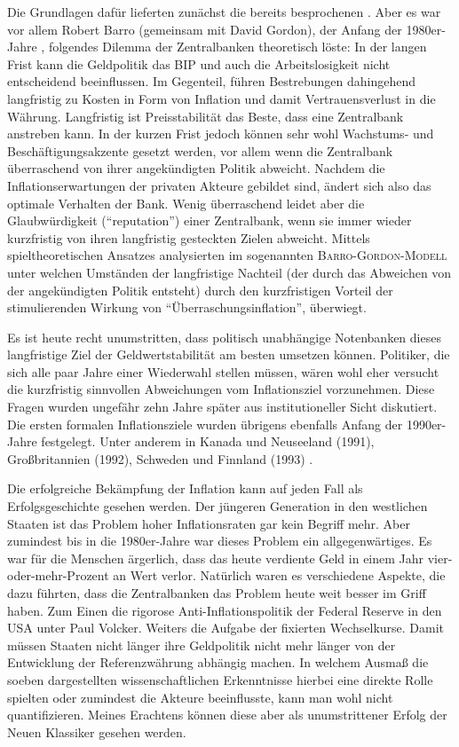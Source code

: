 Die Grundlagen dafür lieferten zunächst die bereits besprochenen \textcite{Kydland1977}. Aber es war vor allem Robert Barro (gemeinsam mit David Gordon), der Anfang der 1980er-Jahre \parencite{Barro1976, Barro1983a, Barro1983b}, folgendes Dilemma der Zentralbanken theoretisch löste: In der langen Frist kann die Geldpolitik das BIP und auch die Arbeitslosigkeit nicht entscheidend beeinflussen. Im Gegenteil, führen Bestrebungen dahingehend langfristig zu Kosten in Form von Inflation und damit Vertrauensverlust in die Währung. Langfristig ist Preisstabilität das Beste, dass eine Zentralbank anstreben kann. In der kurzen Frist jedoch können sehr wohl Wachstums- und Beschäftigungsakzente gesetzt werden, vor allem wenn die Zentralbank überraschend von ihrer angekündigten Politik abweicht. Nachdem die Inflationserwartungen der privaten Akteure gebildet sind, ändert sich also das optimale Verhalten der Bank. Wenig überraschend leidet aber die Glaubwürdigkeit ("`reputation"') einer Zentralbank, wenn sie immer wieder kurzfristig von ihren langfristig gesteckten Zielen abweicht. Mittels spieltheoretischen Ansatzes analysierten \textcite{Barro1983a} im sogenannten \textsc{Barro-Gordon-Modell} unter welchen Umständen der langfristige Nachteil (der durch das Abweichen von der angekündigten Politik entsteht) durch den kurzfristigen Vorteil der stimulierenden Wirkung von "`Überraschungsinflation"', überwiegt.

Es ist heute recht unumstritten, dass politisch unabhängige Notenbanken dieses langfristige Ziel der Geldwertstabilität am besten umsetzen können. Politiker, die sich alle paar Jahre einer Wiederwahl stellen müssen, wären wohl eher versucht die kurzfristig sinnvollen Abweichungen vom Inflationsziel vorzunehmen. Diese Fragen wurden ungefähr zehn Jahre später aus institutioneller Sicht \parencite{Tabellini1993} diskutiert. Die ersten formalen Inflationsziele wurden übrigens ebenfalls Anfang der 1990er-Jahre festgelegt. Unter anderem in Kanada und Neuseeland (1991), Großbritannien (1992), Schweden und Finnland (1993) \parencite{Fischer1994}. 

Die erfolgreiche Bekämpfung der Inflation kann auf jeden Fall als Erfolgsgeschichte gesehen werden. Der jüngeren Generation in den westlichen Staaten ist das Problem hoher Inflationsraten gar kein Begriff mehr. Aber zumindest bis in die 1980er-Jahre war dieses Problem ein allgegenwärtiges. Es war für die Menschen ärgerlich, dass das heute verdiente Geld in einem Jahr vier-oder-mehr-Prozent an Wert verlor. Natürlich waren es verschiedene Aspekte, die dazu führten, dass die Zentralbanken das Problem heute weit besser im Griff haben. Zum Einen die rigorose Anti-Inflationspolitik der Federal Reserve in den USA unter Paul Volcker. Weiters die Aufgabe der fixierten Wechselkurse. Damit müssen Staaten nicht länger ihre Geldpolitik nicht mehr länger von der Entwicklung der Referenzwährung abhängig machen. In welchem Ausmaß die soeben dargestellten wissenschaftlichen Erkenntnisse hierbei eine direkte Rolle spielten oder zumindest die Akteure beeinflusste, kann man wohl nicht quantifizieren. Meines Erachtens können diese aber als unumstrittener Erfolg der Neuen Klassiker gesehen werden.

